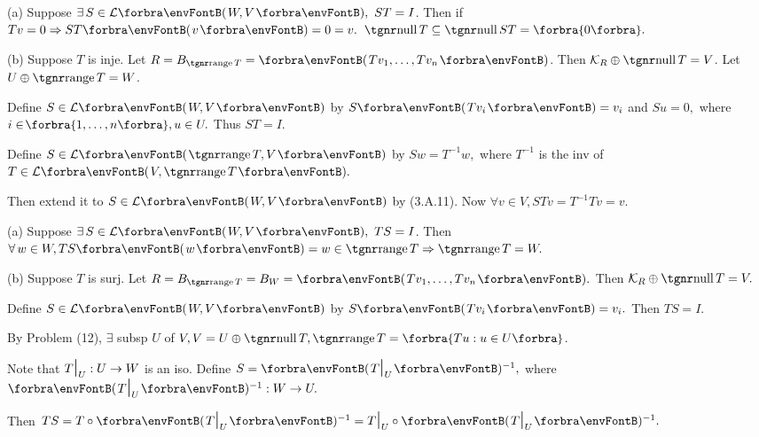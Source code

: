 \par\quad
(a) Suppose $\exists\,S\in\Lm{W,V},\,\,ST=I$. Then if $Tv=0\Rightarrow ST\Par{v}=0=v.$ \Or $\null T\subseteq\null ST=\zeroSubs.$\par\quad
(b) Suppose $T$ is inje. Let $R=B_{\range T}=\Par{Tv_1,\dots,Tv_n}$. Then $\mathcal{K}_R\oplus\null T=V$. Let $U\oplus\range T=W$.\par\quad\Hb
Define $S\in\Lm{W,V}$ by $S\Par{Tv_i}=v_i$ and $Su=0,$ where $i\in\!\Bra{1,\dots,n},u\in U.$ Thus $ST=I.$\par\vspace{6pt}\quad\Hb
\Or Define $S\in\Lm{\range T,V}$ by $Sw=T^{-1}w,$ {\tgsl where $T^{-1}$ is the inv of $T\in\Lm{V,\range T}.$}\par\quad\Hb
Then extend it to $S\in\Lm{W,V}$ by (3.A.11). Now $\forall v\in V,STv=T^{-1}Tv=v.$\PfEnd
\SepLine

\par\quad
(a) Suppose $\exists\,S\in\Lm{W,V},\,\,TS=I$. Then $\forall\,w\in W,TS\Par{w}=w\in\range T\Rightarrow \range T=W.$\par\quad
(b) Suppose $T$ is surj. Let $R=B_{\range T}=B_{W}=\Par{Tv_1,\dots,Tv_n}.$ Then $\mathcal{K}_R\oplus\null T=V.$\par\quad\Hb
Define $S\in\Lm{W,V}$ by $S\Par{Tv_i}=v_i.$ Then $TS=I.$\par\vspace{6pt}\quad\Hb
\Or By Problem (12), $\exists$ subsp $U$ of $V,V=U\oplus\null T,\range T=\Bra{Tu:u\in U}$.\par\quad\Hb
Note that $T\text{\Large|}_U:U\rightarrow W$ is an iso. Define $S=\Par{T\mmid_U}{^{-1}},$ where $\Par{T\mmid_U}{^{-1}}:W\rightarrow U.$\par\quad\Hb
Then $TS=T\circ\Par{T\mmid_U}{^{-1}}=T\mmid_U\circ\Par{T\mmid_U}{^{-1}}.$\PfEnd
\SepLine

